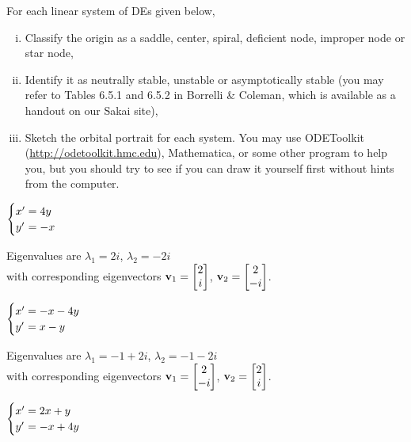 \documentclass[boxes,printing,blanks,hmc]{gsypset}
\begin{document}
\begin{problem}
	For each linear system of DEs given below,
	\begin{enumerate}[(i)]
		\item Classify the origin as a saddle, center, spiral, deficient node, improper node or
		  star node,
		\item Identify it as neutrally stable, unstable or asymptotically
		  stable (you may refer to Tables 6.5.1 and 6.5.2 in Borrelli \& Coleman, which is available as a handout on our Sakai site),
		\item Sketch the orbital portrait for each system. You may use
		  ODEToolkit (\url{http://odetoolkit.hmc.edu}), Mathematica, or some
		  other program to help you, but you should try to see if you can draw
		  it yourself first without hints from the computer.
	\end{enumerate}
	\begin{subproblems}
		\subproblem 
			$\begin{cases}
				x'&\hspace{-.1in}=4y \\
				y'&\hspace{-.1in}=-x
			\end{cases}$
			
			Eigenvalues are $\lambda_1 = 2i$, $\lambda_2=-2i$ \\
			with corresponding eigenvectors $\mathbf{v}_1 = \begin{bmatrix}2 \\ i\end{bmatrix}$, $\mathbf{v}_2 = \begin{bmatrix}2 \\ -i\end{bmatrix}$.
			\begin{solution}
				
			\end{solution}
		\subproblem 
			$\begin{cases}
				x'&\hspace{-.1in}=-x-4y \\
				y'&\hspace{-.1in}=x-y
			\end{cases}$
			
			Eigenvalues are $\lambda_1 =-1+2i$, $\lambda_2 =-1-2i$ \\
			with corresponding eigenvectors $\mathbf{v}_1 = \begin{bmatrix}2 \\ -i\end{bmatrix}$, $\mathbf{v}_2 = \begin{bmatrix}2 \\ i\end{bmatrix}$.
			\begin{solution}
				
			\end{solution}
		\subproblem 
			$\begin{cases}
				x'&\hspace{-.1in}=2x+y \\
				y'&\hspace{-.1in}=-x+4y
			\end{cases}$
			

\end{subproblems}
\end{problem}
\end{document}
